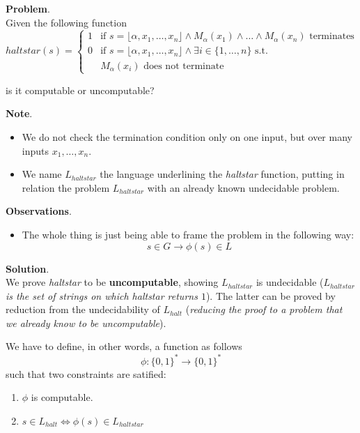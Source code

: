 \begin{example}[title = Haltstar problem]
    \textbf{Problem}. \\
    Given the following function
    \[
        \mathit{haltstar}(s) = 
            \begin{cases} 
                1 & \text{if } s = \lfloor \alpha, x_1, \dots, x_n \rfloor \wedge M_{\alpha}(x_1) \wedge \dots \wedge M_{\alpha}(x_n) \text{ terminates} \\
                0 & \text{if } s = \lfloor \alpha, x_1, \dots, x_n \rfloor \wedge \exists i \in \{1, \dots, n\} \text{ s.t. } \\
                & M_{\alpha}(x_i) \text{ does not terminate}
            \end{cases}
    \]

    is it computable or uncomputable? \vspace{14pt}

    \textbf{Note}.
    \begin{itemize}
        \renewcommand{\labelitemi}{-}
        \item We do not check the termination condition only on one input, but over many inputs $x_1, \dots, x_n$.
        \item We name $L_{haltstar}$ the language underlining the \textit{haltstar} function, putting in relation the problem $L_{haltstar}$ with an already known undecidable problem.
    \end{itemize} \vspace{14pt}

    \textbf{Observations}.
    \begin{itemize}
        \renewcommand{\labelitemi}{-}
        \item The whole thing is just being able to frame the problem in the following way: $$ s \in G \rightarrow \phi(s) \in L $$
    \end{itemize} \vspace{14pt}

    \textbf{Solution}. \\
    We prove \textit{haltstar} to be \textbf{uncomputable}, showing $L_{haltstar}$ is undecidable (\textit{$L_{haltstar}$ is the set of strings on which 
    haltstar returns $1$}). The latter can be proved by reduction from the undecidability of $L_{halt}$ (\textit{reducing the proof to a problem that 
    we already know to be uncomputable}). \vspace{7pt}

    We have to define, in other words, a function as follows 
    $$ \phi: \{0,1\}^* \rightarrow \{0,1\}^* $$
    such that two constraints are satified:
    \begin{enumerate}
        \item $\phi$ is computable.
        \item $s \in L_{halt} \Leftrightarrow \phi(s) \in L_{haltstar}$
    \end{enumerate} \vspace{7pt}


\end{example}
